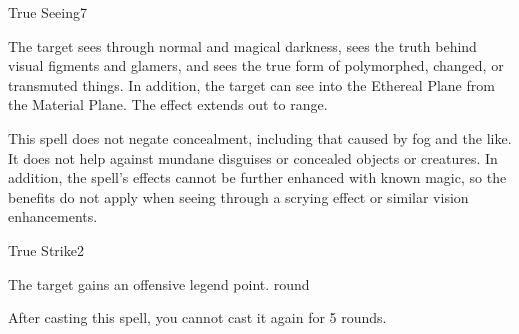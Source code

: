 \begin{spellsection}{True Seeing}{7}
    \begin{spellheader}
    \end{spellheader}
    \begin{spellcontent}
        \begin{spelltargetinginfo}
        \end{spelltargetinginfo}
        \begin{spelleffects}
            \spelleffect The target sees through normal and magical darkness, sees the truth behind visual figments and glamers, and sees the true form of polymorphed, changed, or transmuted things. In addition, the target can see into the Ethereal Plane from the Material Plane. The effect extends out to \rngmed range.
            \spelldur \durshort
        \end{spelleffects}
    \end{spellcontent}
    \begin{spellfooter}
        \spellnotes This spell does not negate concealment, including that caused by fog and the like. It does not help against mundane disguises or concealed objects or creatures. In addition, the spell's effects cannot be further enhanced with known magic, so the benefits do not apply when seeing through a scrying effect or similar vision enhancements.
        \miscastexplode
    \end{spellfooter}
\end{spellsection}

\begin{spellsection}{True Strike}{2}
    \begin{spellheader}
    \end{spellheader}
    \begin{spellcontent}
        \begin{spelltargetinginfo}
        \end{spelltargetinginfo}
        \begin{spelleffects}
            \spelleffect The target gains an offensive legend point.
             round
        \end{spelleffects}
    \end{spellcontent}
    \begin{spellfooter}
        \spellnotes After casting this spell, you cannot cast it again for 5 rounds.
        \miscastrandom
    \end{spellfooter}
\end{spellsection}

